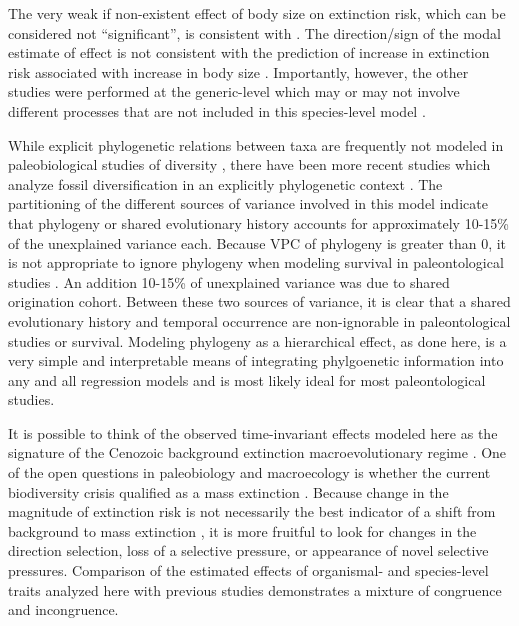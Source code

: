 \documentclass[12pt,letterpaper]{article}
\begin{document}
The very weak if non-existent effect of body size on extinction risk, which can be considered not ``significant'', is consistent with \citet{Tomiya2013}. The direction/sign of the modal estimate of effect is not consistent with the prediction of increase in extinction risk associated with increase in body size \citep{Liow2008}. Importantly, however, the other studies were performed at the generic-level which may or may not involve different processes that are not included in this species-level model \citep{Liow2008,Tomiya2013}.

While explicit phylogenetic relations between taxa are frequently not modeled in paleobiological studies of diversity \citep{Alroy2009,Foote2013,Jablonski2006a,Hunt2007a,Liow2008,Payne2007,Alroy2000g,Jernvall2002,Jernvall2004,Marcot2014}, there have been more recent studies which analyze fossil diversification in an explicitly phylogenetic context \citep{Slater2012,Slater2013a,Tomiya2013,Harnik2014,Simpson2011a}. The partitioning of the different sources of variance involved in this model indicate that phylogeny or shared evolutionary history accounts for approximately 10-15\% of the unexplained variance each. Because VPC of phylogeny is greater than 0, it is not appropriate to ignore phylogeny when modeling survival in paleontological studies \citep{Housworth2004}. An addition 10-15\% of unexplained variance was due to shared origination cohort. Between these two sources of variance, it is clear that a shared evolutionary history and temporal occurrence are non-ignorable in paleontological studies or survival. Modeling phylogeny as a hierarchical effect, as done here, is a very simple and interpretable means of integrating phylgoenetic information into any and all regression models \citep{Lynch1991,Housworth2004} and is most likely ideal for most paleontological studies.


It is possible to think of the observed time-invariant effects modeled here as the signature of the Cenozoic background extinction macroevolutionary regime \citep{Jablonski1986}. One of the open questions in paleobiology and macroecology is whether the current biodiversity crisis qualified as a mass extinction \citep{Alroy2010,Barnosky2011,Barnosky2012a}. Because change in the magnitude of extinction risk is not necessarily the best indicator of a shift from background to mass extinction \citep{Wang2003}, it is more fruitful to look for changes in the direction selection, loss of a selective pressure, or appearance of novel selective pressures. Comparison of the estimated effects of organismal- and species-level traits analyzed here with previous studies demonstrates a mixture of congruence and incongruence. 
\end{document}
